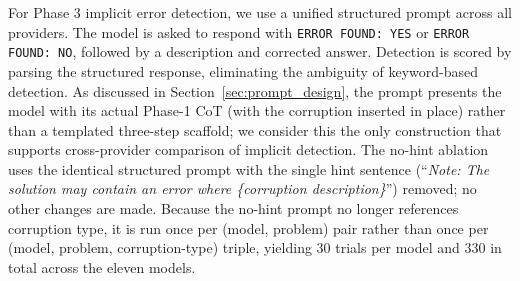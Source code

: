 \documentclass{article}
\begin{document}
For Phase 3 implicit error detection, we use a unified structured prompt across all providers. The model is asked to respond with \texttt{ERROR FOUND: YES} or \texttt{ERROR FOUND: NO}, followed by a description and corrected answer. Detection is scored by parsing the structured response, eliminating the ambiguity of keyword-based detection. As discussed in Section~\ref{sec:prompt_design}, the prompt presents the model with its actual Phase-1 CoT (with the corruption inserted in place) rather than a templated three-step scaffold; we consider this the only construction that supports cross-provider comparison of implicit detection. The no-hint ablation uses the identical structured prompt with the single hint sentence (``\emph{Note: The solution may contain an error where \{corruption description\}}'') removed; no other changes are made. Because the no-hint prompt no longer references corruption type, it is run once per (model, problem) pair rather than once per (model, problem, corruption-type) triple, yielding 30 trials per model and 330 in total across the eleven models.
\end{document}
